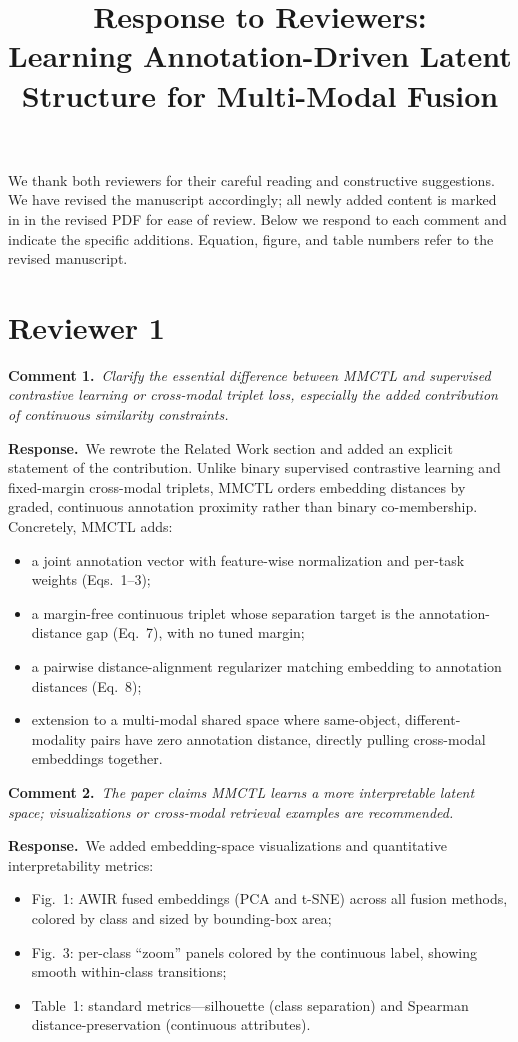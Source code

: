 \documentclass[10pt,twocolumn,letterpaper]{article}
\newcommand{\cmt}[2]{\smallskip\noindent\textbf{Comment #1.}\ \textit{#2}\par}
\newcommand{\resp}[1]{\noindent\textbf{Response.}\ #1\par}
\begin{document}
\title{Response to Reviewers:\\ Learning Annotation-Driven Latent Structure for Multi-Modal Fusion}

\maketitle
\thispagestyle{empty}

\noindent We thank both reviewers for their careful reading and constructive
suggestions. We have revised the manuscript accordingly; all newly added content
is marked in  in the revised PDF for ease of review. Below we respond to
each comment and indicate the specific additions. Equation, figure, and table
numbers refer to the revised manuscript.

\section{Reviewer 1}

\cmt{1}{Clarify the essential difference between MMCTL and supervised contrastive
learning or cross-modal triplet loss, especially the added contribution of
continuous similarity constraints.}
\resp{We rewrote the Related Work section and added an explicit statement of the
contribution. Unlike binary supervised contrastive learning and fixed-margin
cross-modal triplets, MMCTL orders embedding distances by graded, continuous
annotation proximity rather than binary co-membership. Concretely, MMCTL adds:}
\begin{itemize}
  \item a joint annotation vector with feature-wise normalization and per-task weights (Eqs.~1--3);
  \item a margin-free continuous triplet whose separation target is the annotation-distance gap (Eq.~7), with no tuned margin;
  \item a pairwise distance-alignment regularizer matching embedding to annotation distances (Eq.~8);
  \item extension to a multi-modal shared space where same-object, different-modality pairs have zero annotation distance, directly pulling cross-modal embeddings together.
\end{itemize}

\cmt{2}{The paper claims MMCTL learns a more interpretable latent space;
visualizations or cross-modal retrieval examples are recommended.}
\resp{We added embedding-space visualizations and quantitative interpretability metrics:}
\begin{itemize}
  \item Fig.~1: AWIR fused embeddings (PCA and t-SNE) across all fusion methods, colored by class and sized by bounding-box area;
  \item Fig.~3: per-class ``zoom'' panels colored by the continuous label, showing smooth within-class transitions;
  \item Table~1: standard metrics---silhouette (class separation) and Spearman distance-preservation (continuous attributes).
\end{itemize}
\end{document}

